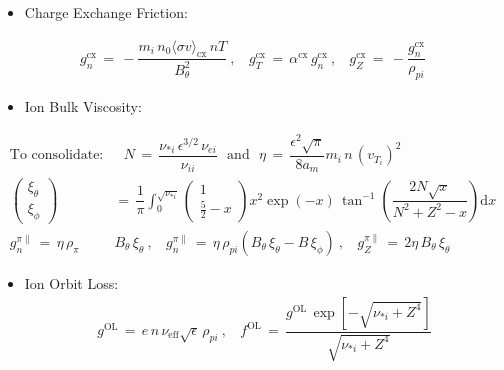 \documentclass[a4paper,8pt]{article}
\providecommand{\tightlist}{%
  \setlength{\itemsep}{0pt}\setlength{\parskip}{0pt}}
\begin{document}
\begin{itemize}
\tightlist
\item
  Charge Exchange Friction:
\end{itemize}

\begin{align}
    g_n^\text{cx} \,=\, -\dfrac{m_i \,n_0 \langle\sigma v\rangle_\text{cx} \,n T}{B_\theta^2}~,~~~~ g_T^\text{cx} \,=\, \alpha^\text{cx}\,g_n^\text{cx}~,~~~~ g_Z^\text{cx} \,=\, -\dfrac{g_n^\text{cx}}{\rho_{pi}}
\end{align}

\begin{itemize}
\tightlist
\item
  Ion Bulk Viscosity:
\end{itemize}

\begin{align}
    \text{To consolidate:}&~~~ N \,=\, \dfrac{\nu_{*i}\,\epsilon^{3/2}\,\nu_{ei}}{\nu_{ii}} ~~~\text{and}~~~ \eta \,=\, \dfrac{\epsilon^2 \sqrt{\pi}}{8 a_m} m_i \,n\, (v_{T_i})^2 \\
    \begin{pmatrix}\xi_\theta \\[1ex] \xi_\phi \end{pmatrix} \,&=\, \dfrac{1}{\pi} \int_0^{\sqrt{\nu_{*i}}} \begin{pmatrix} 1 \\ \frac{5}{2} - x \end{pmatrix} x^2 \exp(-x) \, \tan^{-1}\left(\dfrac{2 N \sqrt{x}}{N^2 + Z^2 - x}\right) \text{d}x \\
    g_n^{\pi\parallel} \,=\, \eta \, \rho_{\pi}& B_\theta \, \xi_\theta~,~~~~ g_n^{\pi\parallel} \,=\, \eta \, \rho_{pi} \left(B_\theta\,\xi_\theta - B\,\xi_\phi\right)~,~~~~ g_Z^{\pi\parallel} \,=\, 2\eta \, B_\theta \, \xi_\theta
\end{align}

\begin{itemize}
\tightlist
\item
  Ion Orbit Loss: \begin{align}
    g^\text{OL} \,=\, e \,n\, \nu_\text{eff} \sqrt{\epsilon} \,\rho_{pi}~,~~~~ f^\text{OL} \,=\, \dfrac{g^\text{OL}\,\exp\left[-\sqrt{\nu_{*i} + Z^4}\right]}{\sqrt{\nu_{*i} + Z^4}}
  \end{align}
\end{itemize}
\end{document}
